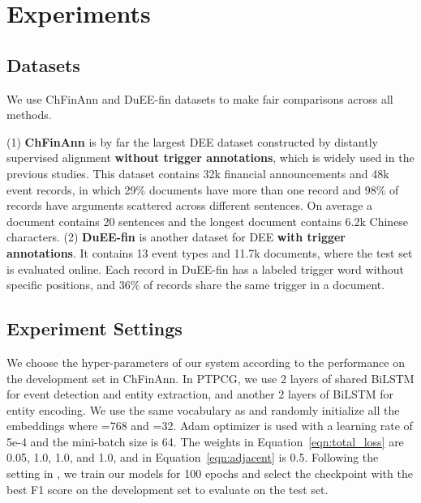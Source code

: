 \section{Experiments}
\subsection{Datasets}

We use ChFinAnn \cite{zheng-etal-2019-doc2edag} and DuEE-fin \cite{duee-fin} datasets to make fair comparisons across all methods.

\noindent (1) \textbf{ChFinAnn} is by far the largest DEE dataset constructed by distantly supervised alignment \textbf{without trigger annotations}, which is widely used in the previous studies.
This dataset contains 32k financial announcements and 48k event records, in which 29\% documents have more than one record and 98\% of records have arguments scattered across different sentences.
On average a document contains 20 sentences and the longest document contains 6.2k Chinese characters.
(2) \textbf{DuEE-fin} is another dataset for DEE \textbf{with trigger annotations}.
It contains 13 event types and 11.7k documents, where the test set is evaluated online.
Each record in DuEE-fin has a labeled trigger word without specific positions, and 36\% of records share the same trigger in a document.

\subsection{Experiment Settings}
We choose the hyper-parameters of our system according to the performance on the development set in ChFinAnn.
In PTPCG, we use 2 layers of shared BiLSTM for event detection and entity extraction, and another 2 layers of BiLSTM for entity encoding.
We use the same vocabulary as \cite{zheng-etal-2019-doc2edag} and randomly initialize all the embeddings where =768 and =32.
Adam \cite{adam} optimizer is used with a learning rate of 5e-4 and the mini-batch size is 64.
The weights in Equation~\ref{eqn:total_loss} are 0.05, 1.0, 1.0, and 1.0, and  in Equation~\ref{eqn:adjacent} is 0.5.
Following the setting in \citet{zheng-etal-2019-doc2edag}, we train our models for 100 epochs and select the checkpoint with the best F1 score on the development set to evaluate on the test set.

